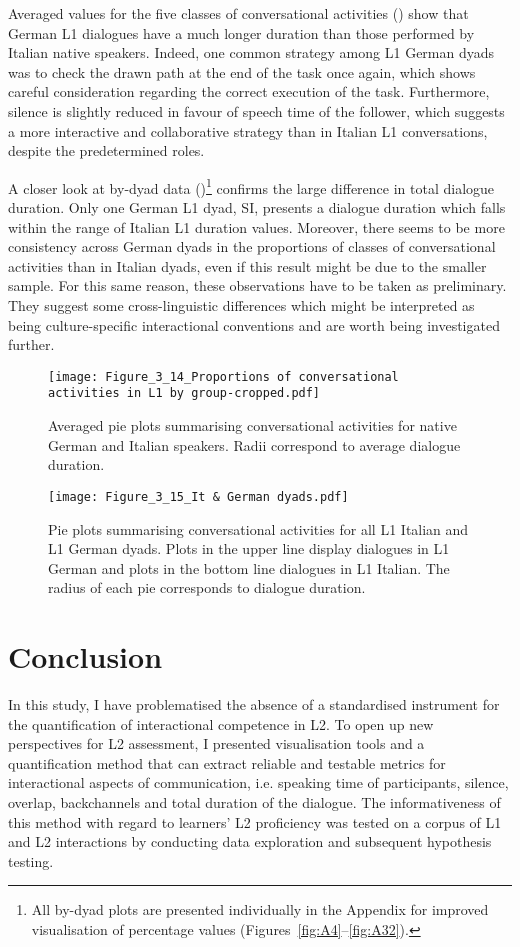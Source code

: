 Averaged values for the five classes of conversational activities () show that German L1 dialogues have a much longer duration than those performed by Italian native speakers. Indeed, one common strategy among L1 German dyads was to check the drawn path at the end of the task once again, which shows careful consideration regarding the correct execution of the task. Furthermore, silence is slightly reduced in favour of speech time of the follower, which suggests a more interactive and collaborative strategy than in Italian L1 conversations, despite the predetermined roles.

A closer look at by-dyad data ()\footnote{All by-dyad plots are presented individually in the Appendix for improved visualisation of percentage values (Figures~\ref{fig:A4}--\ref{fig:A32}).} confirms the large difference in total dialogue duration. Only one German L1 dyad, SI, presents a dialogue duration which falls within the range of Italian L1 duration values. Moreover, there seems to be more consistency across German dyads in the proportions of classes of conversational activities than in Italian dyads, even if this result might be due to the smaller sample. For this same reason, these observations have to be taken as preliminary. They suggest some cross-linguistic differences which might be interpreted as being culture-specific interactional conventions and are worth being investigated further.

\begin{figure}
\texttt{[image: Figure\_3\_14\_Proportions of conversational activities in L1 by group-cropped.pdf]}
\caption{\label{fig:3.14}Averaged pie plots summarising conversational activities for native German and Italian speakers. Radii correspond to average dialogue duration.}
\end{figure}

\begin{figure}
\texttt{[image: Figure\_3\_15\_It \& German dyads.pdf]}
\caption{Pie plots summarising conversational activities for all L1 Italian and L1 German dyads. Plots in the upper line display dialogues in L1 German and plots in the bottom line dialogues in L1 Italian. The radius of each pie corresponds to dialogue duration.}
\label{fig:3.15}
\end{figure}

\section{Conclusion}
\label{sec:3.6}
In this study, I have problematised the absence of a standardised instrument for the quantification of interactional competence in L2. To open up new perspectives for L2 assessment, I presented visualisation tools and a quantification method that can extract reliable and testable metrics for interactional aspects of communication, i.e. speaking time of participants, silence, overlap, backchannels and total duration of the dialogue. The informativeness of this method with regard to learners’ L2 proficiency was tested on a corpus of L1 and L2 interactions by conducting data exploration and subsequent hypothesis testing.

